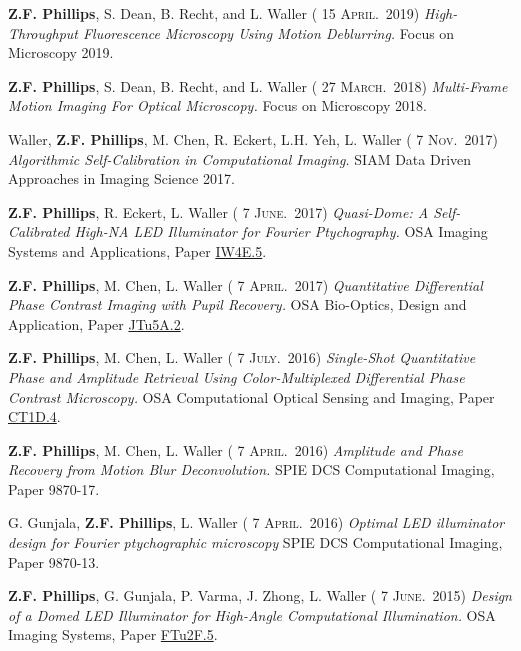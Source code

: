 \documentclass[12pt,letterpaper]{article}
\renewcommand{\date}[1]{{} #1}
\begin{document}
\textbf{Z.F. Phillips}, S. Dean, B. Recht, and L. Waller (\date{15 \textsc{April.}~2019})
\emph{High-Throughput Fluorescence  \linebreak Microscopy Using Motion Deblurring.} Focus on Microscopy 2019.
\medskip

\textbf{Z.F. Phillips}, S. Dean, B. Recht, and L. Waller (\date{27 \textsc{March.}~2018})
\emph{Multi-Frame Motion Imaging For  \linebreak Optical Microscopy.} Focus on Microscopy 2018.
\medskip

Waller, \textbf{Z.F. Phillips}, M. Chen, R. Eckert, L.H. Yeh, L. Waller (\date{7 \textsc{Nov.}~2017})
\emph{Algorithmic  \linebreak Self-Calibration in Computational Imaging.} SIAM Data Driven Approaches in Imaging Science 2017.
\medskip

\textbf{Z.F. Phillips}, R. Eckert, L. Waller (\date{7 \textsc{June.}~2017})
\emph{Quasi-Dome: A Self-Calibrated High-NA LED  \linebreak Illuminator for Fourier Ptychography.} OSA Imaging Systems and Applications, Paper \href{https://www.osapublishing.org/abstract.cfm?uri=COSI-2016-CT1D.4}{IW4E.5}.
\medskip

\textbf{Z.F. Phillips}, M. Chen, L. Waller (\date{7 \textsc{April.}~2017})
\emph{Quantitative Differential Phase Contrast Imaging with Pupil Recovery.} OSA Bio-Optics, Design and Application, Paper \href{https://www.osapublishing.org/abstract.cfm?uri=BODA-2017-JTu5A.2}{JTu5A.2}.
\medskip

\textbf{Z.F. Phillips}, M. Chen, L. Waller (\date{7 \textsc{July.}~2016})
\emph{Single-Shot Quantitative Phase and Amplitude Retrieval Using Color-Multiplexed Differential Phase Contrast Microscopy.} OSA Computational Optical Sensing and Imaging, Paper \href{https://www.osapublishing.org/abstract.cfm?uri=COSI-2016-CT1D.4}{CT1D.4}.
\medskip

\textbf{Z.F. Phillips}, M. Chen, L. Waller (\date{7 \textsc{April.}~2016})
\emph{Amplitude and Phase Recovery from Motion Blur  \linebreak Deconvolution.} SPIE DCS Computational Imaging, Paper 9870-17.
\medskip

G. Gunjala, \textbf{Z.F. Phillips}, L. Waller (\date{7 \textsc{April.}~2016})
\emph{Optimal LED illuminator design for Fourier  \linebreak ptychographic microscopy} SPIE DCS Computational Imaging, Paper 9870-13.
\medskip

\textbf{Z.F. Phillips}, G. Gunjala, P. Varma, J. Zhong, L. Waller (\date{7 \textsc{June.}~2015})
\emph{Design of a Domed LED  \linebreak Illuminator for High-Angle Computational Illumination.} OSA Imaging Systems, Paper \href{https://www.osapublishing.org/abstract.cfm?uri=ISA-2015-ITh1A.2}{FTu2F.5}.
\medskip
\end{document}

